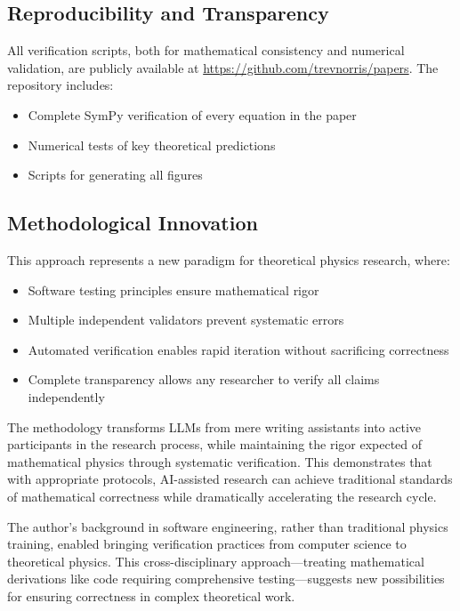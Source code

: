\subsection{Reproducibility and Transparency}
All verification scripts, both for mathematical consistency and numerical validation, are publicly available at \url{https://github.com/trevnorris/papers}. The repository includes:
\begin{itemize}
\item Complete SymPy verification of every equation in the paper
\item Numerical tests of key theoretical predictions
\item Scripts for generating all figures
\end{itemize}

\subsection{Methodological Innovation}
This approach represents a new paradigm for theoretical physics research, where:
\begin{itemize}
\item Software testing principles ensure mathematical rigor
\item Multiple independent validators prevent systematic errors
\item Automated verification enables rapid iteration without sacrificing correctness
\item Complete transparency allows any researcher to verify all claims independently
\end{itemize}

The methodology transforms LLMs from mere writing assistants into active participants in the research process, while maintaining the rigor expected of mathematical physics through systematic verification. This demonstrates that with appropriate protocols, AI-assisted research can achieve traditional standards of mathematical correctness while dramatically accelerating the research cycle.

\begin{remark}
The author's background in software engineering, rather than traditional physics training, enabled bringing verification practices from computer science to theoretical physics. This cross-disciplinary approach—treating mathematical derivations like code requiring comprehensive testing—suggests new possibilities for ensuring correctness in complex theoretical work.
\end{remark}

